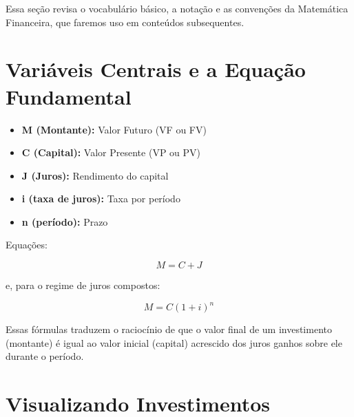 \documentclass[
  a4paper,
]{book}
\providecommand{\tightlist}{%
  \setlength{\itemsep}{0pt}\setlength{\parskip}{0pt}}\usepackage{longtable,booktabs,array}
\begin{document}
\begin{tcolorbox}[enhanced jigsaw, leftrule=.75mm, colframe=quarto-callout-note-color-frame, colbacktitle=quarto-callout-note-color!10!white, breakable, arc=.35mm, rightrule=.15mm, colback=white, toptitle=1mm, opacityback=0, titlerule=0mm, opacitybacktitle=0.6, bottomtitle=1mm, title=\textcolor{quarto-callout-note-color}{\faInfo}\hspace{0.5em}{Linguagem da Matemática Financeira}, bottomrule=.15mm, coltitle=black, toprule=.15mm, left=2mm]

Essa seção revisa o vocabulário básico, a notação e as convenções da
Matemática Financeira, que faremos uso em conteúdos subsequentes.

\section*{Variáveis Centrais e a Equação
Fundamental}\label{variuxe1veis-centrais-e-a-equauxe7uxe3o-fundamental}


\begin{itemize}
\tightlist
\item
  \textbf{M (Montante):} Valor Futuro (VF ou FV)
\item
  \textbf{C (Capital):} Valor Presente (VP ou PV)
\item
  \textbf{J (Juros):} Rendimento do capital
\item
  \textbf{i (taxa de juros):} Taxa por período
\item
  \textbf{n (período):} Prazo
\end{itemize}

Equações:

\[
M = C + J
\]

e, para o regime de juros compostos:

\[
M = C (1 + i)^n
\]

Essas fórmulas traduzem o raciocínio de que o valor final de um
investimento (montante) é igual ao valor inicial (capital) acrescido dos
juros ganhos sobre ele durante o período.

\section*{Visualizando Investimentos}\label{visualizando-investimentos}


\end{tcolorbox}
\end{document}
